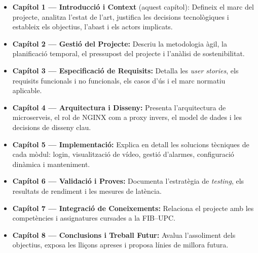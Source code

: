 \begin{itemize}
  \item \textbf{Capítol 1 — Introducció i Context} (aquest capítol): Defineix el marc del projecte, analitza l'estat de l'art, justifica les decisions tecnològiques i estableix els objectius, l'abast i els actors implicats.
  \item \textbf{Capítol 2 — Gestió del Projecte:} Descriu la metodologia àgil, la planificació temporal, el pressupost del projecte i l'anàlisi de sostenibilitat.
  \item \textbf{Capítol 3 — Especificació de Requisits:} Detalla les \textit{user stories}, els requisits funcionals i no funcionals, els casos d'ús i el marc normatiu aplicable.
  \item \textbf{Capítol 4 — Arquitectura i Disseny:} Presenta l'arquitectura de microserveis, el rol de NGINX com a proxy invers, el model de dades i les decisions de disseny clau.
  \item \textbf{Capítol 5 — Implementació:} Explica en detall les solucions tècniques de cada mòdul: login, visualització de vídeo, gestió d'alarmes, configuració dinàmica i manteniment.
  \item \textbf{Capítol 6 — Validació i Proves:} Documenta l'estratègia de \textit{testing}, els resultats de rendiment i les mesures de latència.
  \item \textbf{Capítol 7 — Integració de Coneixements:} Relaciona el projecte amb les competències i assignatures cursades a la FIB--UPC.
  \item \textbf{Capítol 8 — Conclusions i Treball Futur:} Avalua l'assoliment dels objectius, exposa les lliçons apreses i proposa línies de millora futura.
\end{itemize}